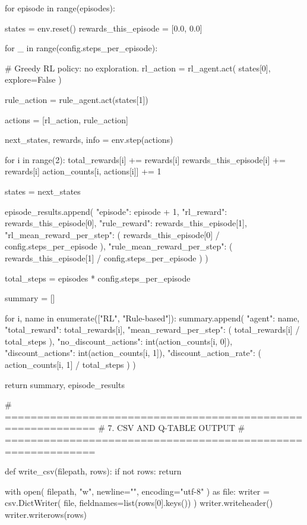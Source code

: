     for episode in range(episodes):

        states = env.reset()
        rewards_this_episode = [0.0, 0.0]

        for _ in range(config.steps_per_episode):

            # Greedy RL policy: no exploration.
            rl_action = rl_agent.act(
                states[0], explore=False
            )

            rule_action = rule_agent.act(states[1])

            actions = [rl_action, rule_action]

            next_states, rewards, info = env.step(actions)

            for i in range(2):
                total_rewards[i] += rewards[i]
                rewards_this_episode[i] += rewards[i]
                action_counts[i, actions[i]] += 1

            states = next_states

        episode_results.append({
            "episode": episode + 1,
            "rl_reward": rewards_this_episode[0],
            "rule_reward": rewards_this_episode[1],
            "rl_mean_reward_per_step": (
                rewards_this_episode[0]
                / config.steps_per_episode
            ),
            "rule_mean_reward_per_step": (
                rewards_this_episode[1]
                / config.steps_per_episode
            )
        })

    total_steps = episodes * config.steps_per_episode

    summary = []

    for i, name in enumerate(["RL", "Rule-based"]):
        summary.append({
            "agent": name,
            "total_reward": total_rewards[i],
            "mean_reward_per_step": (
                total_rewards[i] / total_steps
            ),
            "no_discount_actions": int(action_counts[i, 0]),
            "discount_actions": int(action_counts[i, 1]),
            "discount_action_rate": (
                action_counts[i, 1] / total_steps
            )
        })

    return summary, episode_results


# ============================================================
# 7. CSV AND Q-TABLE OUTPUT
# ============================================================

def write_csv(filepath, rows):
    if not rows:
        return

    with open(
        filepath, "w", newline="", encoding="utf-8"
    ) as file:
        writer = csv.DictWriter(
            file, fieldnames=list(rows[0].keys())
        )
        writer.writeheader()
        writer.writerows(rows)


